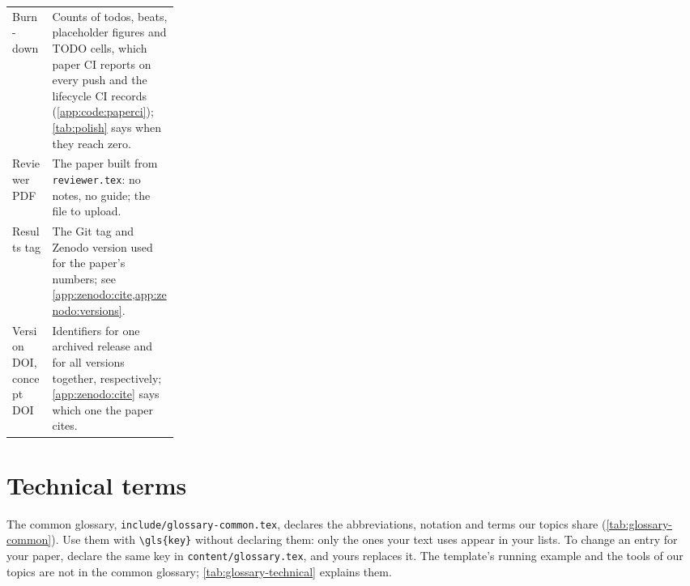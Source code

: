 {\begin{xltabular}{\linewidth}{>{\raggedright\arraybackslash}p{0.24\linewidth} X}
  Burn-down & Counts of todos, beats, placeholder figures and TODO cells, which paper CI reports on every push and the lifecycle CI records (\cref{app:code:paperci}); \cref{tab:polish} says when they reach zero. \\
  Reviewer PDF & The paper built from \texttt{reviewer.tex}: no notes, no guide; the file to upload. \\
  Results tag & The Git tag and Zenodo version used for the paper's numbers; see \cref{app:zenodo:cite,app:zenodo:versions}. \\
  Version DOI, concept DOI & Identifiers for one archived release and for all versions together, respectively; \cref{app:zenodo:cite} says which one the paper cites. \\
\end{xltabular}
}

\section{Technical terms}
The common glossary, \texttt{include/glossary-common.tex}, declares the abbreviations, notation and terms our topics share (\cref{tab:glossary-common}). Use them with \texttt{\textbackslash gls\{key\}} without declaring them: only the ones your text uses appear in your lists. To change an entry for your paper, declare the same key in \texttt{content/glossary.tex}, and yours replaces it. The template's running example and the tools of our topics are not in the common glossary; \cref{tab:glossary-technical} explains them.

